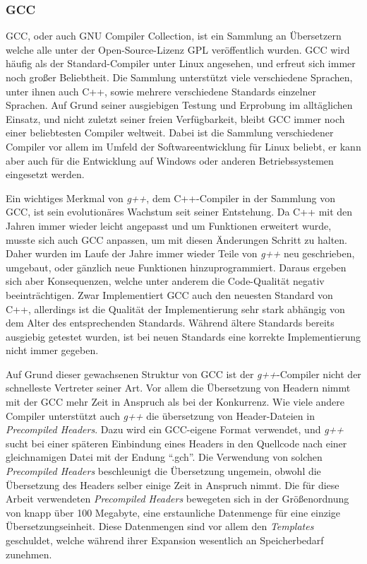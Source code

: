 \subsubsection{GCC}
GCC, oder auch GNU Compiler Collection, ist ein Sammlung an Übersetzern welche alle unter der Open-Source-Lizenz GPL veröffentlich wurden. GCC wird häufig als der Standard-Compiler unter Linux angesehen,
und erfreut sich immer noch großer Beliebtheit. Die Sammlung unterstützt viele verschiedene Sprachen, unter ihnen auch C++, sowie mehrere verschiedene Standards einzelner Sprachen. Auf Grund seiner
ausgiebigen Testung und Erprobung im alltäglichen Einsatz, und nicht zuletzt seiner freien Verfügbarkeit, bleibt GCC immer noch einer beliebtesten Compiler weltweit. Dabei ist die Sammlung verschiedener
Compiler vor allem im Umfeld der Softwareentwicklung für Linux beliebt, er kann aber auch für die Entwicklung auf Windows oder anderen Betriebssystemen eingesetzt werden.

Ein wichtiges Merkmal von \textit{g++}, dem C++-Compiler in der Sammlung von GCC, ist sein evolutionäres Wachstum seit seiner Entstehung. Da C++ mit den Jahren immer wieder leicht angepasst und um Funktionen
erweitert wurde, musste sich auch GCC anpassen, um mit diesen Änderungen Schritt zu halten. Daher wurden im Laufe der Jahre immer wieder Teile von \textit{g++} neu geschrieben, umgebaut, oder gänzlich
neue Funktionen hinzuprogrammiert. Daraus ergeben sich aber Konsequenzen, welche unter anderem die Code-Qualität negativ beeinträchtigen. Zwar Implementiert GCC auch den neuesten Standard von C++, allerdings
ist die Qualität der Implementierung sehr stark abhängig von dem Alter des entsprechenden Standards. Während ältere Standards bereits ausgiebig getestet wurden, ist bei neuen Standards eine korrekte 
Implementierung nicht immer gegeben. 

Auf Grund dieser gewachsenen Struktur von GCC ist der \textit{g++}-Compiler nicht der schnelleste Vertreter seiner Art. Vor allem die Übersetzung von Headern nimmt mit der GCC mehr Zeit in Anspruch als
bei der Konkurrenz. Wie viele andere Compiler unterstützt auch \textit{g++} die übersetzung von Header-Dateien in \textit{Precompiled Headers}. Dazu wird ein GCC-eigene Format verwendet, und \textit{g++} sucht bei einer
späteren Einbindung eines Headers in den Quellcode nach einer gleichnamigen Datei mit der Endung ``.gch''. Die Verwendung von solchen \textit{Precompiled Headers} beschleunigt die Übersetzung ungemein, 
obwohl die Übersetzung des Headers selber einige Zeit in Anspruch nimmt. Die für diese Arbeit verwendeten \textit{Precompiled Headers} bewegeten sich in der Größenordnung von knapp über 100 Megabyte, 
eine erstaunliche Datenmenge für eine einzige Übersetzungseinheit. Diese Datenmengen sind vor allem den \textit{Templates} geschuldet, welche während ihrer Expansion wesentlich an Speicherbedarf zunehmen.

